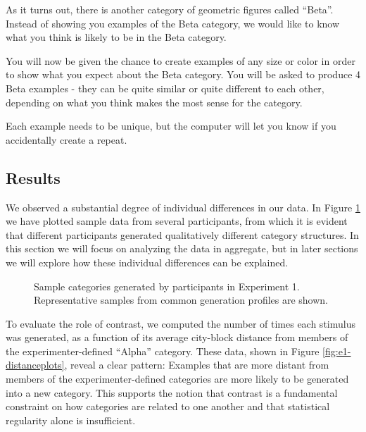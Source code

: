 \documentclass[12pt]{article}
\newcommand\inputpgf[2]{{
\let\pgfimageWithoutPath\pgfimage
\renewcommand{\pgfimage}[2][]{\pgfimageWithoutPath[##1]{#1/##2}}

}}
\begin{document}
\begin{flushleft}
\begin{displayquote} As it turns out, there is another category of geometric
figures called ``Beta''. Instead of showing you examples of the Beta category,
we would like to know what you think is likely to be in the Beta category.

You will now be given the chance to create examples of any size or color in
order to show what you expect about the Beta category. You will be asked to
produce 4 Beta examples - they can be quite similar or quite different to each
other, depending on what you think makes the most sense for the category.

Each example needs to be unique, but the computer will let you know if you
accidentally create a repeat.
\end{displayquote}

\subsection{Results}

We observed a substantial degree of individual differences in our data. In
Figure \ref{fig:e1-samples} we have plotted sample data from several
participants, from which it is evident that different participants generated
qualitatively different category structures. In this section we will focus on
analyzing the data in aggregate, but in later sections we will explore how these
individual differences can be explained.

\begin{figure}
    \begin{center} \inputpgf{figs/}{e1-samples.pgf}
    \caption{Sample categories generated by participants in Experiment 1.
Representative samples from common generation profiles are shown.}
    \label{fig:e1-samples}
    \end{center}
\end{figure}

To evaluate the role of contrast, we computed the number of times each stimulus
was generated, as a function of its average city-block distance from members of
the experimenter-defined ``Alpha'' category. These data, shown in Figure
\ref{fig:e1-distanceplots}, reveal a clear pattern: Examples that are more
distant from members of the experimenter-defined categories are more likely to
be generated into a new category. This supports the notion that contrast is a
fundamental constraint on how categories are related to one another and that statistical
regularity alone is insufficient.



\end{flushleft}
\end{document}
